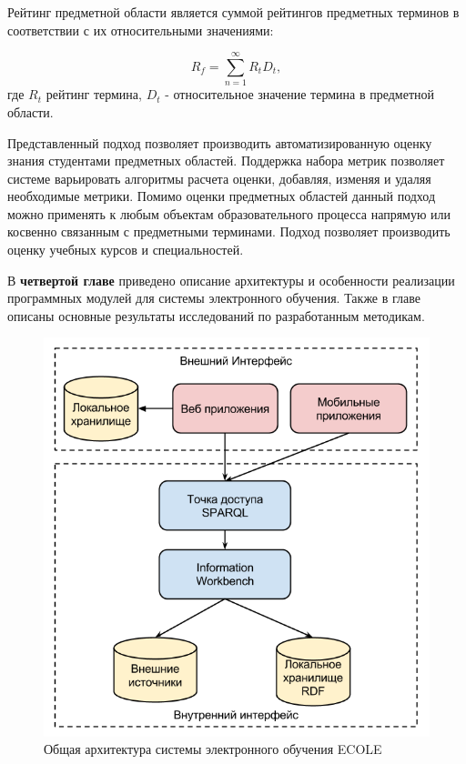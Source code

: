 Рейтинг предметной области является суммой рейтингов предметных терминов в соответствии с их относительными значениями:

$$
    R_f = \sum_{n=1}^{\infty} R_tD_t,
$$
где \(R_t\) рейтинг термина, \(D_t\) - относительное значение термина в предметной области.

Представленный подход позволяет производить автоматизированную оценку знания студентами предметных областей. Поддержка набора метрик позволяет системе варьировать алгоритмы расчета оценки, добавляя, изменяя и удаляя необходимые метрики. Помимо оценки предметных областей данный подход можно применять к любым объектам образовательного процесса напрямую или косвенно связанным с предметными терминами. Подход позволяет производить оценку учебных курсов и специальностей.  

В \textbf{четвертой главе} приведено описание архитектуры и особенности реализации программных модулей для системы электронного обучения. Также в главе описаны основные результаты исследований по разработанным методикам.

\begin{figure}[ht] 
  \center
  \includegraphics[scale=0.40]{OverallArch}
  \caption{Общая архитектура системы электронного обучения ECOLE} 
  \label{fig:OverallArch}
\end{figure}


